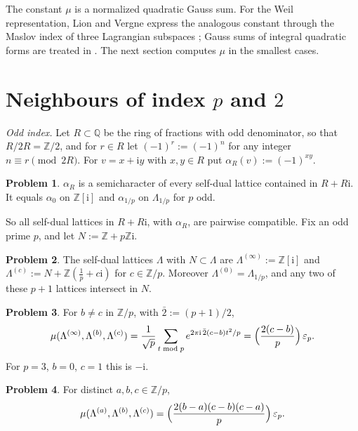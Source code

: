 \documentclass[reqno]{amsart}
\theoremstyle{definition}
\newtheorem{problem}{Problem}[section]
\theoremstyle{plain}
\newcommand{\Z}{\mathbb{Z}}
\newcommand{\Q}{\mathbb{Q}}
\newcommand{\ii}{\mathrm{i}}
\newcommand{\leg}[2]{\Bigl(\frac{#1}{#2}\Bigr)}
\begin{document}
The constant \(\mu\) is a normalized quadratic Gauss sum.  For the Weil representation, Lion and Vergne express the analogous constant through the Maslov index of three Lagrangian subspaces \cite{LV}; Gauss sums of integral quadratic forms are treated in \cite[App.~B]{Pol}.  The next section computes \(\mu\) in the smallest cases.

\section{Neighbours of index \texorpdfstring{\(p\)}{p} and \texorpdfstring{\(2\)}{2}}\label{sec:neighbours}

\emph{Odd index.}  Let \(R \subset \Q\) be the ring of fractions with odd denominator, so that \(R/2R = \Z/2\), and for \(r \in R\) let \((-1)^r := (-1)^n\) for any integer \(n \equiv r \pmod{2R}\).  For \(v = x + \ii y\) with \(x, y \in R\) put \(\alpha_R(v) := (-1)^{xy}\).

\begin{problem}\label{pr:alphaR}
\(\alpha_R\) is a semicharacter of every self-dual lattice contained in \(R + R\ii\).  It equals \(\alpha_0\) on \(\Z[\ii]\) and \(\alpha_{1/p}\) on \(\Lambda_{1/p}\) for \(p\) odd.
\end{problem}

So all self-dual lattices in \(R + R\ii\), with \(\alpha_R\), are pairwise compatible.  Fix an odd prime \(p\), and let \(N := \Z + p\Z\ii\).

\begin{problem}\label{pr:p-neighbours}
The self-dual lattices \(\Lambda\) with \(N \subset \Lambda\) are \(\Lambda^{(\infty)} := \Z[\ii]\) and \(\Lambda^{(c)} := N + \Z(\frac1p + c\ii)\) for \(c \in \Z/p\).  Moreover \(\Lambda^{(0)} = \Lambda_{1/p}\), and any two of these \(p + 1\) lattices intersect in \(N\).
\end{problem}

\begin{problem}\label{pr:mu-p}
For \(b \ne c\) in \(\Z/p\), with \(\bar 2 := (p+1)/2\),
\[
  \mu(\Lambda^{(\infty)}, \Lambda^{(b)}, \Lambda^{(c)}) = \frac{1}{\sqrt p} \sum_{t \bmod p} e^{2\pi\ii\, \bar2 (c-b) t^2/p} = \leg{2(c-b)}{p}\, \varepsilon_p .
\]
For \(p = 3\), \(b = 0\), \(c = 1\) this is \(-\ii\).
\end{problem}

\begin{problem}\label{pr:mu-p-gen}
For distinct \(a, b, c \in \Z/p\),
\[
  \mu(\Lambda^{(a)}, \Lambda^{(b)}, \Lambda^{(c)}) = \leg{2(b-a)(c-b)(c-a)}{p}\, \varepsilon_p .
\]
\end{problem}
\end{document}
